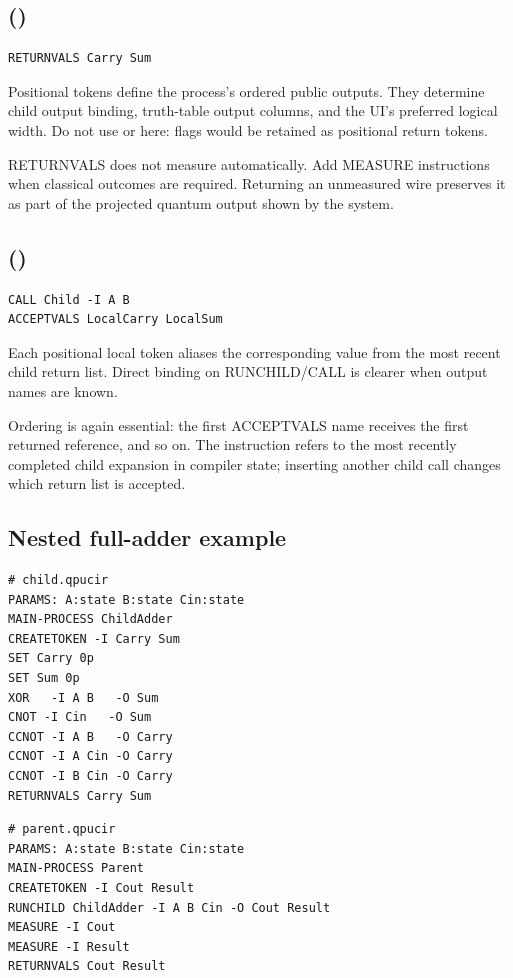 \subsection{ (\implemented)}

\begin{lstlisting}
RETURNVALS Carry Sum
\end{lstlisting}
Positional tokens define the process's ordered public outputs. They determine
child output binding, truth-table output columns, and the UI's preferred
logical width. Do not use  or  here: flags would be retained
as positional return tokens.

RETURNVALS does not measure automatically. Add MEASURE instructions when
classical outcomes are required. Returning an unmeasured wire preserves it as
part of the projected quantum output shown by the system.

\subsection{ (\implemented)}

\begin{lstlisting}
CALL Child -I A B
ACCEPTVALS LocalCarry LocalSum
\end{lstlisting}
Each positional local token aliases the corresponding value from the most
recent child return list. Direct  binding on RUNCHILD/CALL is clearer
when output names are known.

Ordering is again essential: the first ACCEPTVALS name receives the first
returned reference, and so on. The instruction refers to the most recently
completed child expansion in compiler state; inserting another child call
changes which return list is accepted.

\subsection{Nested full-adder example}

\begin{lstlisting}
# child.qpucir
PARAMS: A:state B:state Cin:state
MAIN-PROCESS ChildAdder
CREATETOKEN -I Carry Sum
SET Carry 0p
SET Sum 0p
XOR   -I A B   -O Sum
CNOT -I Cin   -O Sum
CCNOT -I A B   -O Carry
CCNOT -I A Cin -O Carry
CCNOT -I B Cin -O Carry
RETURNVALS Carry Sum
\end{lstlisting}

\begin{lstlisting}
# parent.qpucir
PARAMS: A:state B:state Cin:state
MAIN-PROCESS Parent
CREATETOKEN -I Cout Result
RUNCHILD ChildAdder -I A B Cin -O Cout Result
MEASURE -I Cout
MEASURE -I Result
RETURNVALS Cout Result
\end{lstlisting}

